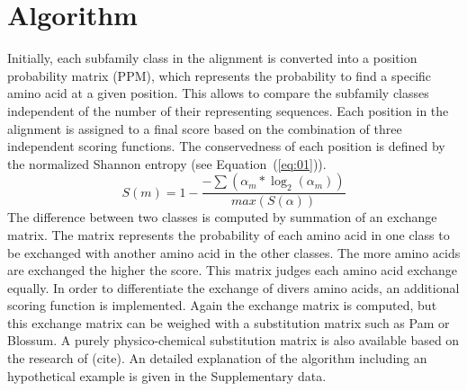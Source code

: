\documentclass{bioinfo}
\begin{document}
\section{Algorithm}
%

%
Initially, each subfamily class in the alignment is converted into a position 
probability matrix (PPM), which represents the probability to find a specific 
amino acid at a given position. This allows to compare the subfamily classes 
independent of the number of their representing sequences. 
Each position in the alignment is assigned to a final score based on the combination 
of three independent scoring functions.
%
The conservedness of each position is defined by the normalized Shannon entropy (see Equation~(\ref{eq:01})).
%
\begin{equation}
S(m) = 1 - \frac{-\sum(\alpha_m*\log_2(\alpha_m))}{max(S(\alpha))} \label{eq:01} %
\end{equation}  
%
The difference between two classes is computed by summation of an exchange matrix. The matrix
represents the probability of each amino acid in one class to be exchanged with another amino acid in 
the other classes. The more amino acids are exchanged the higher the score.
This matrix judges each amino acid exchange equally.
%
In order to differentiate the exchange of divers amino acids,
an additional scoring function is implemented. Again the exchange matrix is computed, but
this exchange matrix can be weighed with a substitution matrix such as
Pam or Blossum. A purely physico-chemical substitution matrix is also
available based on the research of (cite).
%
An detailed explanation of the algorithm including an 
hypothetical example is given in the Supplementary data.
\end{document}
